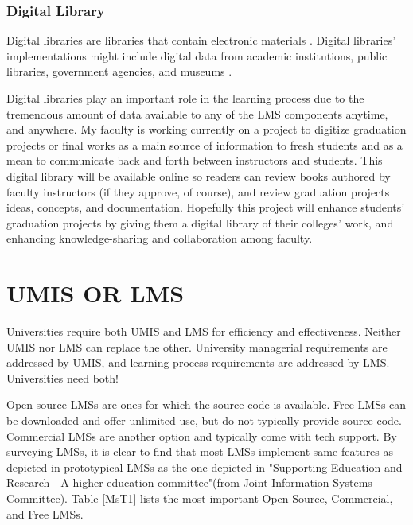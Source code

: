 \documentclass[12pt,a4paper,final,twoside,onecolumn,titlepage]{book}
\begin{document}
\subsubsection{Digital Library}
Digital libraries are libraries that contain electronic materials \cite{UMIS39}. Digital libraries' implementations might include digital data from academic institutions, public libraries, government agencies, and museums \cite{UMIS40}.

Digital libraries play an important role in the learning process due to the tremendous amount of data available to any of the \gls{LMS} components anytime, and anywhere. My faculty is working currently on a project to digitize graduation projects or final works as a main source of information to fresh students and as a mean to communicate back and forth between instructors and students. This digital library will be available online so readers can review books authored by faculty instructors (if they approve, of course), and review graduation projects ideas, concepts, and documentation. Hopefully this project will enhance students' graduation projects by giving them a digital library of their colleges' work, and enhancing knowledge-sharing and collaboration among faculty.

\section{UMIS OR LMS}
Universities require both \gls{UMIS} and \gls{LMS} for efficiency and effectiveness. Neither \gls{UMIS} nor \gls{LMS} can replace the other. University managerial requirements are addressed by \gls{UMIS}, and learning process requirements are addressed by \gls{LMS}. Universities need both!

Open-source \gls{LMS}s are ones for which the source code is available. Free \gls{LMS}s can be downloaded and offer unlimited use, but do not typically provide source code. Commercial \gls{LMS}s are another option and typically come with tech support. By surveying \gls{LMS}s, it is clear to find that most \gls{LMS}s implement same features as depicted in prototypical \gls{LMS}s as the one depicted in "Supporting Education and Research—A higher education committee"(from Joint Information Systems Committee). Table \ref{MsT1} lists the most important Open Source, Commercial, and Free \gls{LMS}s.
\end{document}

